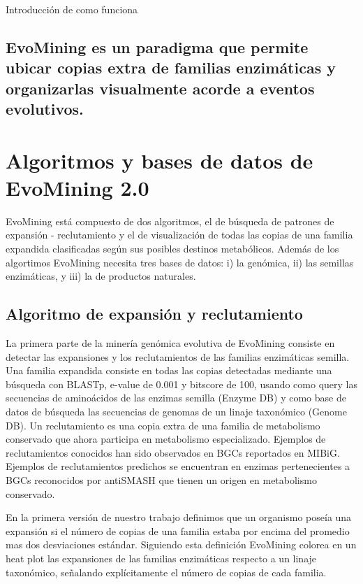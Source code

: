 \documentclass[12pt,twoside]{reedthesis}
\begin{document}
  Introducción de como funciona
  
  \subsection{EvoMining es un paradigma que permite ubicar copias extra de
  familias enzimáticas y organizarlas visualmente acorde a eventos
  evolutivos.}\label{evomining-es-un-paradigma-que-permite-ubicar-copias-extra-de-familias-enzimaticas-y-organizarlas-visualmente-acorde-a-eventos-evolutivos.}
  
  \section{Algoritmos y bases de datos de EvoMining
  2.0}\label{algoritmos-y-bases-de-datos-de-evomining-2.0}
  
  EvoMining está compuesto de dos algoritmos, el de búsqueda de patrones
  de expansión - reclutamiento y el de visualización de todas las copias
  de una familia expandida clasificadas según sus posibles destinos
  metabólicos. Además de los algortimos EvoMining necesita tres bases de
  datos: i) la genómica, ii) las semillas enzimáticas, y iii) la de
  productos naturales.
  
  \subsection{Algoritmo de expansión y
  reclutamiento}\label{algoritmo-de-expansion-y-reclutamiento}
  
  La primera parte de la minería genómica evolutiva de EvoMining consiste
  en detectar las expansiones y los reclutamientos de las familias
  enzimáticas semilla. Una familia expandida consiste en todas las copias
  detectadas mediante una búsqueda con BLASTp, e-value de 0.001 y bitscore
  de 100, usando como query las secuencias de aminoácidos de las enzimas
  semilla (Enzyme DB) y como base de datos de búsqueda las secuencias de
  genomas de un linaje taxonómico (Genome DB). Un reclutamiento es una
  copia extra de una familia de metabolismo conservado que ahora participa
  en metabolismo especializado. Ejemplos de reclutamientos conocidos han
  sido observados en BGCs reportados en MIBiG. Ejemplos de reclutamientos
  predichos se encuentran en enzimas pertenecientes a BGCs reconocidos por
  antiSMASH que tienen un origen en metabolismo conservado.
  
  En la primera versión de nuestro trabajo definimos que un organismo
  poseía una expansión si el número de copias de una familia estaba por
  encima del promedio mas dos desviaciones estándar. Siguiendo esta
  definición EvoMining colorea en un heat plot las expansiones de las
  familias enzimáticas respecto a un linaje taxonómico, señalando
  explícitamente el número de copias de cada familia.
  
\end{document}
